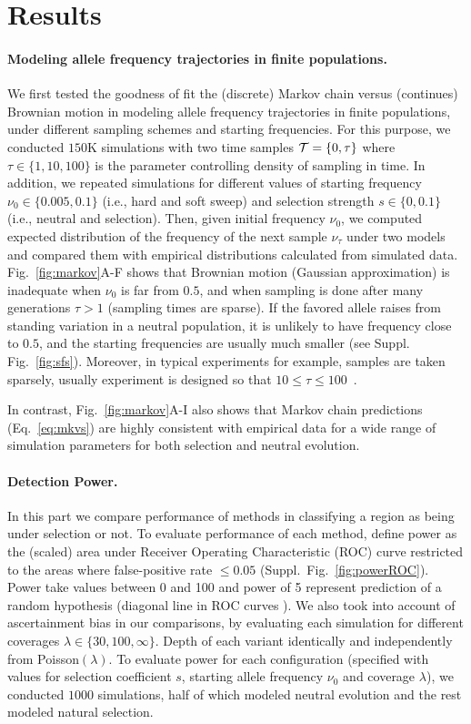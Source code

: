 \section{Results}
\paragraph{Modeling allele frequency trajectories in finite populations.} 
We first tested the goodness of fit the (discrete) Markov chain versus 
(continues) Brownian motion in modeling allele frequency trajectories in finite 
populations, under different sampling schemes and starting frequencies.
For this purpose, we conducted $150$K simulations with two time samples 
${\cal T}=\{0,\tau\}$ where $\tau\in
\{1,10,100\}$ is the parameter controlling density of sampling in time.
In addition, we repeated simulations for different values of starting 
frequency  $\nu_0\in\{0.005,0.1\}$ (i.e., hard and soft sweep) and selection 
strength $s\in\{0,0.1\}$ 
(i.e., neutral and selection). Then, given initial frequency $\nu_0$, we 
computed expected distribution of the frequency of the next sample $\nu_\tau$ 
under two models and compared them with empirical distributions calculated from 
simulated data.
Fig.~\ref{fig:markov}A-F shows that Brownian motion (Gaussian approximation) is
inadequate when $\nu_0$ is far from $0.5$, and when sampling is done
after many generations $\tau>1$ (sampling times are sparse). If the favored 
allele raises from standing variation in a neutral population, it is unlikely 
to have frequency
close to $0.5$, and the starting frequencies are usually much
smaller (see Suppl. Fig.~\ref{fig:sfs}). Moreover, in typical
\dmel experiments for example, samples are taken sparsely, usually experiment 
is designed so that  
$10\le\tau\le100$~\cite{kofler2013guide, orozco2012adaptation, 
zhou2011experimental}.

In contrast, Fig.~\ref{fig:markov}A-I also shows that Markov
chain predictions (Eq.~\ref{eq:mkvs}) are highly consistent with
empirical data for a wide range of simulation parameters for both selection and 
neutral evolution.

\paragraph{Detection Power.} 
In this part we compare performance of methods in classifying a region as being 
under selection or not.
To evaluate performance of each method, define power as the 
(scaled) area under Receiver Operating Characteristic (ROC) curve restricted to 
the areas where false-positive rate $\le 0.05$ 
(Suppl.~Fig.~\ref{fig:powerROC}). Power take values between 0 and 100 and power 
of 5 represent prediction of a random hypothesis (diagonal line in ROC curves 
). 
We also took into account of ascertainment bias in our comparisons, by 
evaluating each simulation for different coverages $\lambda\in 
\{30,100,\infty\}$. Depth of each variant identically and  independently from 
Poisson$(\lambda)$. 
To evaluate power for each configuration (specified with 
values for selection coefficient $s$, starting allele frequency
$\nu_0$ and coverage $\lambda$), we conducted $1000$ simulations, half of which
modeled neutral evolution and the rest modeled natural selection.

